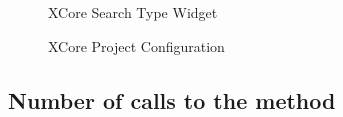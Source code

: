         \begin{figure}
             \centering
             \caption{XCore Search Type Widget}
             \label{fig:IMethod}
        \end{figure}    

        \begin{figure}
             \centering
             \caption{XCore Project Configuration}
             \label{fig:xcoreTableFull}
        \end{figure}    

\subsection{Number of calls to the method}

